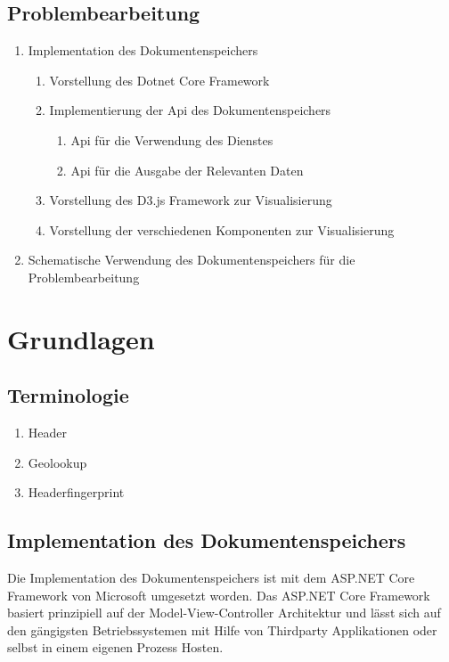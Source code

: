 \documentclass[
    fontsize=12pt,
    headings=small,
    parskip=half,           %
    bibliography=totoc,
    numbers=noenddot,       %
    open=any,               %
    ]{scrreprt}
\begin{document}
\section{Problembearbeitung}
\begin{enumerate}
\item Implementation des Dokumentenspeichers 
\begin{enumerate}
\item Vorstellung des Dotnet Core Framework
\item Implementierung der Api des Dokumentenspeichers
\begin{enumerate}
\item Api für die Verwendung des Dienstes
\item Api für die Ausgabe der Relevanten Daten
\end{enumerate}
\item Vorstellung des D3.js Framework zur Visualisierung
\item Vorstellung der verschiedenen Komponenten zur Visualisierung 
\end{enumerate}
\item Schematische Verwendung des Dokumentenspeichers für die Problembearbeitung
\end{enumerate}

\chapter{Grundlagen}

\section{Terminologie}
\begin{enumerate}
\item Header
\item Geolookup
\item Headerfingerprint
\end{enumerate}

\section{Implementation des Dokumentenspeichers}

Die Implementation des Dokumentenspeichers ist mit dem ASP.NET Core Framework von Microsoft umgesetzt worden. Das ASP.NET Core Framework basiert prinzipiell auf der Model-View-Controller Architektur und lässt sich auf den gängigsten Betriebssystemen mit Hilfe von Thirdparty Applikationen oder selbst in einem eigenen Prozess Hosten. 
\end{document}
